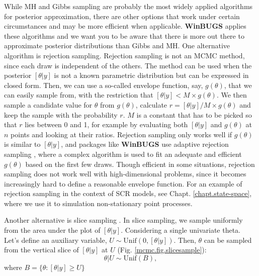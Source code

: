 While MH and Gibbs sampling are probably the most widely applied
algorithms for posterior approximation, there are other options that
work under certain circumstances and may be more efficient when
applicable. {\bf WinBUGS} applies these algorithms and we want you to be
aware that there is more out there to approximate posterior
distributions than Gibbs and MH.  One alternative algorithm is
rejection sampling. Rejection sampling is not an MCMC method, since
each draw is independent of the others. The method can be used when
the posterior $[\theta|y]$ is not a known parametric distribution but
can be expressed in closed form. Then, we can use a so-called envelope
function, say, $g(\theta)$, that we can easily sample from, with the
restriction that $[\theta|y] < M \times g(\theta)$. We then sample a
candidate value for $\theta$ from $g(\theta)$, calculate $r =
[\theta|y]/M \times g(\theta)$ and keep the sample with the probability
$r$. $M$ is a constant that has to be picked so that $r$ lies between
0 and 1, for example by evaluating both $[\theta|y]$ and $g(\theta)$
at $n$ points and looking at their ratios. Rejection sampling only
works well if $g(\theta)$ is similar to $[\theta|y]$, and packages
like {\bf WinBUGS} use adaptive rejection sampling \citep{gilks_wild:1992},
where a complex algorithm is used to fit an adequate and efficient
$g(\theta)$ based on the first few draws. 
Though efficient in some
situations, rejection sampling does not work well with
high-dimensional problems, since it becomes increasingly hard to
define a reasonable envelope function. For an example of rejection
sampling in the context of SCR models, see
Chapt. \ref{chapt.state-space}, where we use it to simulation
non-stationary point processes.  

Another alternative is slice sampling
\citep{neal:2003}. In slice sampling, we sample uniformly from the
area under the plot of $[\theta|y]$. Considering a single univariate
theta. Let's define an auxiliary variable, $U \sim \mbox{Unif}(0,
[\theta|y])$. Then, $\theta$ can be sampled from the vertical slice
of $[\theta|y]$ at $U$ (Fig. \ref{mcmc.fig.slicesample}):
\[
\theta|U \sim \mbox{Unif}(B),
\]
where $B = \{\theta: [\theta|y] \geq U\}$

